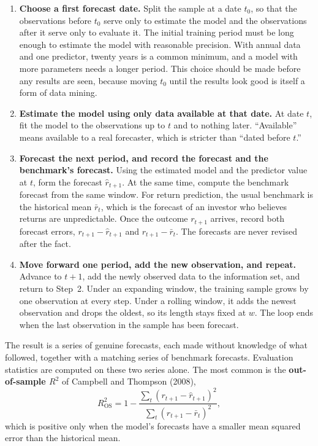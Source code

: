 \begin{enumerate}
  \item \textbf{Choose a first forecast date.} Split the sample at a date $t_0$, so that the observations before $t_0$ serve only to estimate the model and the observations after it serve only to evaluate it. The initial training period must be long enough to estimate the model with reasonable precision. With annual data and one predictor, twenty years is a common minimum, and a model with more parameters needs a longer period. This choice should be made before any results are seen, because moving $t_0$ until the results look good is itself a form of data mining.

  \item \textbf{Estimate the model using only data available at that date.} At date $t$, fit the model to the observations up to $t$ and to nothing later. ``Available'' means available to a real forecaster, which is stricter than ``dated before $t$.'' 

  \item \textbf{Forecast the next period, and record the forecast and the benchmark's forecast.} Using the estimated model and the predictor value at $t$, form the forecast $\hat{r}_{t+1}$. At the same time, compute the benchmark forecast from the same window. For return prediction, the usual benchmark is the historical mean $\bar{r}_t$, which is the forecast of an investor who believes returns are unpredictable. Once the outcome $r_{t+1}$ arrives, record both forecast errors, $r_{t+1} - \hat{r}_{t+1}$ and $r_{t+1} - \bar{r}_t$. The forecasts are never revised after the fact.

  \item \textbf{Move forward one period, add the new observation, and repeat.} Advance to $t+1$, add the newly observed data to the information set, and return to Step~2. Under an expanding window, the training sample grows by one observation at every step. Under a rolling window, it adds the newest observation and drops the oldest, so its length stays fixed at $w$. The loop ends when the last observation in the sample has been forecast.
\end{enumerate}

The result is a series of genuine forecasts, each made without knowledge of what followed, together with a matching series of benchmark forecasts. Evaluation statistics are computed on these two series alone. The most common is the \textbf{out-of-sample $R^2$} of Campbell and Thompson (2008),
\begin{equation}
R^2_{\text{OS}} = 1 - \frac{\sum_{t} \left( r_{t+1} - \hat{r}_{t+1} \right)^2}{\sum_{t} \left( r_{t+1} - \bar{r}_t \right)^2},
\label{eq:05-r2os}
\end{equation}
which is positive only when the model's forecasts have a smaller mean squared error than the historical mean.

